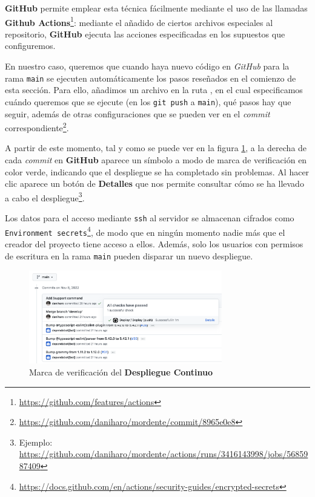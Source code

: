 \textbf{GitHub} permite emplear esta técnica fácilmente mediante el uso de las llamadas \textbf{Github Actions}\footnote{\url{https://github.com/features/actions}}: mediante el añadido de ciertos archivos especiales al repositorio, \textbf{GitHub} ejecuta las acciones especificadas en los supuestos que configuremos.

En nuestro caso, queremos que cuando haya nuevo código en \textit{GitHub} para la rama \texttt{main} se ejecuten automáticamente los pasos reseñados en el comienzo de esta sección. Para ello, añadimos un archivo en la ruta , en el cual especificamos cuándo queremos que se ejecute (en los \texttt{git push} a \texttt{main}), qué pasos hay que seguir, además de otras configuraciones que se pueden ver en el \textit{commit} correspondiente\footnote{\url{https://github.com/daniharo/mordente/commit/8965e0e8}}.

A partir de este momento, tal y como se puede ver en la figura \ref{fig:marcaDeploy}, a la derecha de cada \textit{commit} en \textbf{GitHub} aparece un símbolo a modo de marca de verificación en color verde, indicando que el despliegue se ha completado sin problemas. Al hacer clic aparece un botón de \textbf{Detalles} que nos permite consultar cómo se ha llevado a cabo el despliegue\footnote{Ejemplo: \url{https://github.com/daniharo/mordente/actions/runs/3416143998/jobs/5685987409}}.

Los datos para el acceso mediante \texttt{ssh} al servidor se almacenan cifrados como \texttt{Environment secrets}\footnote{\url{https://docs.github.com/en/actions/security-guides/encrypted-secrets}}, de modo que en ningún momento nadie más que el creador del proyecto tiene acceso a ellos. Además, solo los usuarios con permisos de escritura en la rama \texttt{main} pueden disparar un nuevo despliegue.


\begin{figure}[h]
\centering
\includegraphics[width=0.75\textwidth]{imagenes/implementacion/marcaDeploy.png}
\caption{Marca de verificación del \textbf{Despliegue Continuo}}
\label{fig:marcaDeploy}
\end{figure}

